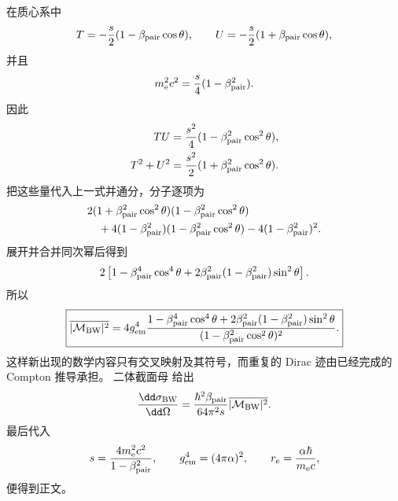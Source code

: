 \begin{derivation}
在质心系中
\begin{equation*}
 T=-\frac s2(1-\beta_{\rm pair}\cos\theta),
 \qquad
 U=-\frac s2(1+\beta_{\rm pair}\cos\theta),
\end{equation*}
并且
\begin{equation*}
 m_{\mathrm e}^2c^2=\frac s4(1-\beta_{\rm pair}^2).
\end{equation*}
因此
\begin{align*}
 TU
 &=\frac{s^2}{4}(1-\beta_{\rm pair}^2\cos^2\theta),\\
 T^2+U^2
 &=\frac{s^2}{2}(1+\beta_{\rm pair}^2\cos^2\theta).
\end{align*}
把这些量代入上一式并通分，分子逐项为
\begin{align*}
 &2(1+\beta_{\rm pair}^2\cos^2\theta)
 (1-\beta_{\rm pair}^2\cos^2\theta)\\
 &\quad+4(1-\beta_{\rm pair}^2)
 (1-\beta_{\rm pair}^2\cos^2\theta)
 -4(1-\beta_{\rm pair}^2)^2.
\end{align*}
展开并合并同次幂后得到
\begin{equation*}
 2\left[
 1-\beta_{\rm pair}^4\cos^4\theta
 +2\beta_{\rm pair}^2(1-\beta_{\rm pair}^2)\sin^2\theta
 \right].
\end{equation*}
所以
\begin{equation*}
 \boxed{
 \overline{|\mathcal M_{\rm BW}|^2}
 =4g_{\rm em}^4
 \frac{
 1-\beta_{\rm pair}^4\cos^4\theta
 +2\beta_{\rm pair}^2(1-\beta_{\rm pair}^2)\sin^2\theta
 }{(1-\beta_{\rm pair}^2\cos^2\theta)^2}.}
\end{equation*}
这样新出现的数学内容只有交叉映射及其符号，而重复的 Dirac 迹由已经完成的 Compton 推导承担。
二体截面母 给出
\begin{equation*}
 \frac{\dd\sigma_{\rm BW}}{\dd\Omega}
 =\frac{\hbar^2\beta_{\rm pair}}{64\pi^2s}
 \overline{|\mathcal M_{\rm BW}|^2}.
\end{equation*}
最后代入
\begin{equation*}
 s=\frac{4m_{\mathrm e}^2c^2}{1-\beta_{\rm pair}^2},\qquad
 g_{\rm em}^4=(4\pi\alpha)^2,\qquad
 r_e=\frac{\alpha\hbar}{m_{\mathrm e} c},
\end{equation*}
便得到正文。
\end{derivation}


